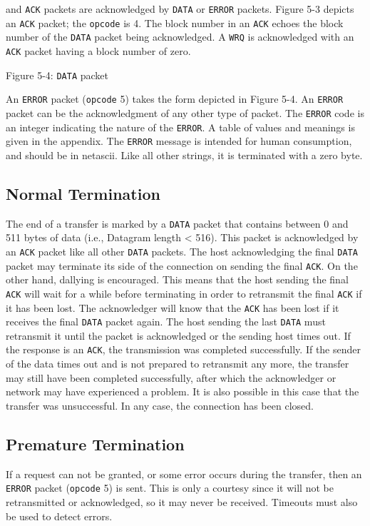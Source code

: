 \documentclass[12pt]{article}
\begin{document}
and \verb|ACK| packets are acknowledged by \verb|DATA| or  \verb|ERROR| packets. Figure 5-3 depicts an \verb|ACK| packet; the \verb|opcode| is 4. The block number in an \verb|ACK| echoes the block number of the \verb|DATA| packet being acknowledged. A \verb|WRQ| is acknowledged with an \verb|ACK| packet having a block number of zero.
\begin{center}
Figure 5-4: \verb|DATA| packet
\end{center}

An  \verb|ERROR| packet (\verb|opcode| 5) takes the form depicted in Figure 5-4. An  \verb|ERROR| packet can be the acknowledgment of any other type of packet. The  \verb|ERROR| code is an integer indicating the nature of the  \verb|ERROR|. A table of values and meanings is given in the appendix. The  \verb|ERROR| message is intended for human consumption, and should be in netascii. Like all other strings, it is terminated with a zero byte.

\subsection{Normal Termination}
The end of a transfer is marked by a \verb|DATA| packet that contains between 0 and 511 bytes of data (i.e., Datagram length < 516). This packet is acknowledged by an \verb|ACK| packet like all other \verb|DATA| packets. The host acknowledging the final \verb|DATA| packet may terminate its side of the connection on sending the final \verb|ACK|. On the other hand, dallying is encouraged. This means that the host sending the final \verb|ACK| will wait for a while before terminating in order to retransmit the final \verb|ACK| if it has been lost. The acknowledger will know that the \verb|ACK| has been lost if it receives the final \verb|DATA| packet again. The host sending the last \verb|DATA| must retransmit it until the packet is acknowledged or the sending host times out. If the response is an \verb|ACK|, the transmission was completed successfully. If the sender of the data times out and is not prepared to retransmit any more, the transfer may still have been completed successfully, after which the acknowledger or network may have experienced a problem. It is also possible in this case that the transfer was unsuccessful. In any case, the connection has been closed.

\subsection{Premature Termination}
If a request can not be granted, or some error occurs during the transfer, then an \verb|ERROR| packet (\verb|opcode| 5) is sent. This is only a courtesy since it will not be retransmitted or acknowledged, so it may never be received. Timeouts must also be used to detect errors.
\end{document}
